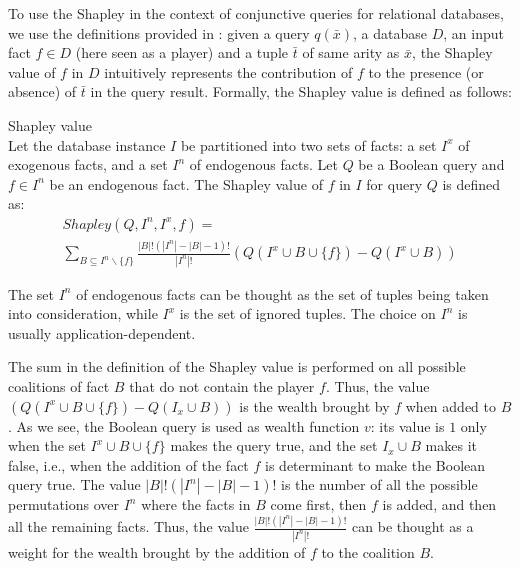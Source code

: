 \label{sec:shapley_value}

To use the Shapley in the context of conjunctive queries for relational databases, we use the definitions provided in \cite{DFKM22}:  given a query $q(\bar{x})$, a database $D$, an input fact $f \in D$ (here seen as a player) and a tuple $\bar{t}$ of same arity as $\bar{x}$, the Shapley value of $f$ in $D$ intuitively represents the contribution of $f$ to the presence (or absence) of $\bar{t}$ in the query result.
Formally, the Shapley value is defined as follows:

\begin{definition}{Shapley value \cite{Deutch2021Shapley}}\\
	Let the database instance $I$ be partitioned into two sets of facts: a set $I^x$ of  exogenous facts, and a set $I^n$ of endogenous facts. Let $Q$ be a Boolean query and $f \in I^n$ be an endogenous fact. The Shapley value of $f$ in $I$ for query $Q$ is defined as:
	\begin{multline*}
		Shapley(Q, I^n, I^x, f) = \\ \sum_{B \subseteq I^n\backslash \{ f \}}\frac{|B|!(|I^n| - |B| - 1)!}{|I^n|!}  \left(Q(I^x \cup B \cup \{ f\} ) - Q(I^x \cup B)\right)
	\end{multline*}
\end{definition}

The set $I^n$ of endogenous facts can be thought as the set of tuples being taken into consideration, while $I^x$ is the set of ignored tuples. The choice on $I^n$ is usually application-dependent.

The sum in the definition of the Shapley value is performed on all possible coalitions of fact $B$ that do not contain the player $f$. Thus, the value $\left(Q(I^x \cup B \cup \{ f\} ) - Q(I_x \cup B)\right)$ is the wealth brought by $f$ when added to $B$. As we see, the Boolean query is used as wealth function $v$: its value is $1$ only when the set $I^x \cup B \cup \{ f\}$ makes the query true, and the set $I_x \cup B$ makes it false, i.e., when the addition of the fact $f$ is determinant to make the Boolean query true. 
The value $|B|!(|I^n| - |B| - 1)!$ is the number of all the possible permutations over $I^n$ where the facts in $B$ come first, then $f$ is added, and then all the remaining facts. Thus, the value $\frac{|B|!(|I^n| - |B| - 1)!}{|I^n|!}$ can be thought as a weight for the wealth brought by the addition of $f$ to the coalition $B$. 

